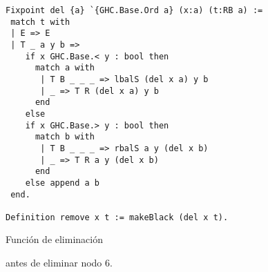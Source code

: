 \begin{figure}[!ht]
\centering
\captionsetup{justification=centering}
\begin{verbatim}
Fixpoint del {a} `{GHC.Base.Ord a} (x:a) (t:RB a) :=
 match t with
 | E => E
 | T _ a y b =>
    if x GHC.Base.< y : bool then
      match a with
       | T B _ _ _ => lbalS (del x a) y b
       | _ => T R (del x a) y b
      end
    else
    if x GHC.Base.> y : bool then
      match b with
       | T B _ _ _ => rbalS a y (del x b)
       | _ => T R a y (del x b)
      end
    else append a b
 end.

Definition remove x t := makeBlack (del x t).
\end{verbatim}
\caption{Función de eliminación}
\label{func_del}
\end{figure}

\begin{figure}[!ht]
\centering
\captionsetup{justification=centering}
\caption{{\Arn antes de eliminar nodo 6.}}
\label{arbolRB_4}
\end{figure}

